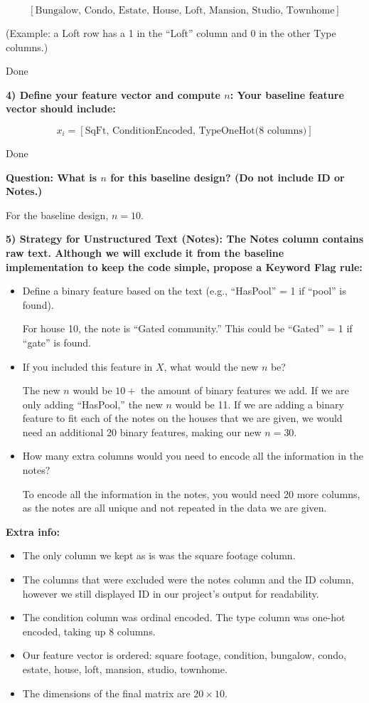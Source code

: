 \documentclass[11pt]{article}
\begin{document}
\[
[\text{Bungalow, Condo, Estate, House, Loft, Mansion, Studio, Townhome}]
\]

(Example: a Loft row has a 1 in the “Loft” column and 0 in the other Type columns.)

Done \checkmark

\textbf{4) Define your feature vector and compute $n$: Your baseline feature vector should include:}

\[
x_i = [\text{SqFt, ConditionEncoded, TypeOneHot(8 columns)}]
\]

Done \checkmark

\textbf{Question: What is $n$ for this baseline design? (Do not include ID or Notes.)}

For the baseline design, $n=10$.

\textbf{5) Strategy for Unstructured Text (Notes): The Notes column contains raw text. Although we will exclude it from the baseline implementation to keep the code simple, propose a Keyword Flag rule:}

\begin{itemize}
    \item Define a binary feature based on the text (e.g., ``HasPool'' = 1 if ``pool'' is found).

    For house 10, the note is ``Gated community.'' This could be ``Gated'' = 1 if ``gate'' is found.

    \item If you included this feature in $X$, what would the new $n$ be?

    The new $n$ would be $10+$ the amount of binary features we add. If we are only adding ``HasPool,'' the new $n$ would be 11. If we are adding a binary feature to fit each of the notes on the houses that we are given, we would need an additional 20 binary features, making our new $n=30$.

    \item How many extra columns would you need to encode all the information in the notes?

    To encode all the information in the notes, you would need 20 more columns, as the notes are all unique and not repeated in the data we are given.
\end{itemize}

\textbf{Extra info:}
\begin{itemize}
    \item The only column we kept as is was the square footage column.
    \item The columns that were excluded were the notes column and the ID column, however we still displayed ID in our project’s output for readability.
    \item The condition column was ordinal encoded. The type column was one-hot encoded, taking up 8 columns.
    \item Our feature vector is ordered: square footage, condition, bungalow, condo, estate, house, loft, mansion, studio, townhome.
    \item The dimensions of the final matrix are $20 \times 10$.
\end{itemize}
\end{document}
